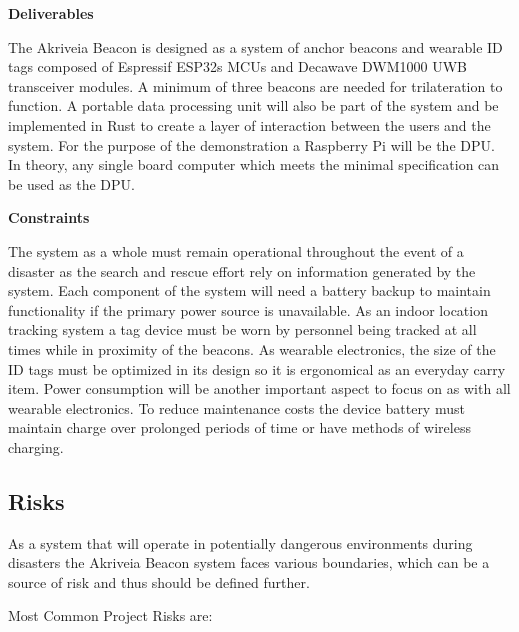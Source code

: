 \bigskip
\textbf{Deliverables}

\medskip
The Akriveia Beacon is designed as a system of anchor beacons and wearable ID tags composed of Espressif ESP32s MCUs and Decawave DWM1000 UWB transceiver modules. A minimum of three beacons are needed for trilateration to function. A portable data processing unit will also be part of the system and be implemented in Rust to create a layer of interaction between the users and the system. For the purpose of the demonstration a Raspberry Pi will be the DPU. In theory, any single board computer which meets the minimal specification can be used as the DPU.

\bigskip
\textbf{Constraints}

\medskip
The system as a whole must remain operational throughout the event of a disaster as the search and rescue effort rely on information generated by the system. Each component of the system will need a battery backup to maintain functionality if the primary power source is unavailable. As an indoor location tracking system a tag device must be worn by personnel being tracked at all times while in proximity of the beacons. As wearable electronics, the size of the ID tags must be optimized in its design so it is ergonomical as an everyday carry item. Power consumption will be another important aspect to focus on as with all wearable electronics. To reduce maintenance costs the device battery must maintain charge over prolonged periods of time or have methods of wireless charging. 



\pagebreak
\subsection{Risks}
\medskip
As a system that will operate in potentially dangerous environments during disasters the Akriveia Beacon system faces various boundaries, which can be a source of risk and thus should be defined further. 

\bigskip
Most Common Project Risks are:

